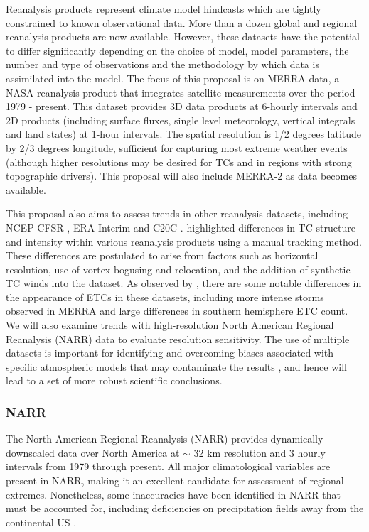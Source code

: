 \documentclass[11pt]{article}
\newcommand\citep{\cite}
\newcommand\citet{\cite}
\begin{document}
Reanalysis products represent climate model hindcasts which are tightly constrained to known observational data.  More than a dozen global and regional reanalysis products are now available.  However, these datasets have the potential to differ significantly depending on the choice of model,  model parameters, the number and type of observations and the methodology by which data is assimilated into the model.  The focus of this proposal is on MERRA \citep{rienecker2011merra} data, a NASA reanalysis product that integrates satellite measurements over the period 1979 - present.  This dataset provides 3D data products at 6-hourly intervals and 2D products (including surface fluxes, single level meteorology, vertical integrals and land states) at 1-hour intervals.  The spatial resolution is 1/2 degrees latitude by 2/3 degrees longitude, sufficient for capturing most extreme weather events (although higher resolutions may be desired for TCs and in regions with strong topographic drivers).  This proposal will also include MERRA-2 as data becomes available.

This proposal also aims to assess trends in other reanalysis datasets, including NCEP CFSR \citep{saha2010ncep}, ERA-Interim \citep{simmons2007era} and C20C \citep{compo2011twentieth}. \citet{Schenkel2012} highlighted differences in TC structure and intensity within various reanalysis products using a manual tracking method. These differences are postulated to arise from factors such as horizontal resolution, use of vortex bogusing and relocation, and the addition of synthetic TC winds into the dataset. As observed by \cite{hodges2011comparison}, there are some notable differences in the appearance of ETCs in these datasets, including more intense storms observed in MERRA and large differences in southern hemisphere ETC count.  We will also examine trends with high-resolution North American Regional Reanalysis (NARR) data to evaluate resolution sensitivity.  The use of multiple datasets is important for identifying and overcoming biases associated with specific atmospheric models that may contaminate the results \citep{jun2008spatial}, and hence will lead to a set of more robust scientific conclusions.

\subsubsection*{NARR} \label{sec:NARR}

The North American Regional Reanalysis (NARR) \citep{mesinger2006north} provides dynamically downscaled data over North America at $\sim$ 32 km resolution and 3 hourly intervals from 1979 through present.  All major climatological variables are present in NARR, making it an excellent candidate for assessment of regional extremes.  Nonetheless, some inaccuracies have been identified in NARR that must be accounted for, including deficiencies on precipitation fields away from the continental US \citep{bukovsky2007brief}.
\end{document}

